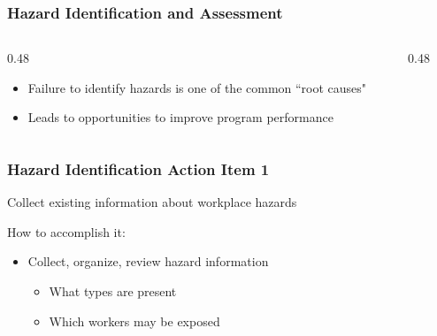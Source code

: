 \begin{frame}
	\frametitle{Hazard Identification and Assessment}
    \begin{columns}
        \begin{column}{0.48\linewidth}
            \begin{itemize}[<+- | alert@+>]
                \item Failure to identify hazards is one of the common ``root causes"
                \item Leads to opportunities to improve program performance
            \end{itemize}
        \end{column}
        \begin{column}{0.48\linewidth}
        \end{column}
    \end{columns}
\end{frame}

\begin{frame}
	\frametitle{Hazard Identification Action Item 1}
    
    Collect existing information about workplace hazards

    \begin{block}{How to accomplish it:}
        \begin{itemize}[<+- | alert@+>]
            \item Collect, organize, review hazard information
            \begin{itemize}
                \item What types are present
                \item Which workers may be exposed
            \end{itemize}
        \end{itemize}
    \end{block}
\end{frame}

